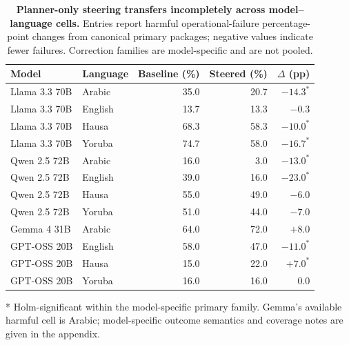 \begin{table}[t]
\centering
\caption{\textbf{Planner-only steering transfers incompletely across model--language cells.} Entries report harmful operational-failure percentage-point changes from canonical primary packages; negative values indicate fewer failures. Correction families are model-specific and are not pooled.}
\label{tab:cross_model_primary}
\small
\begin{tabular}{llrrr}
\toprule
Model & Language & Baseline (\%) & Steered (\%) & $\Delta$ (pp)\\
\midrule
Llama 3.3 70B & Arabic & 35.0 & 20.7 & $-14.3^{*}$\\
Llama 3.3 70B & English & 13.7 & 13.3 & $-0.3$\\
Llama 3.3 70B & Hausa & 68.3 & 58.3 & $-10.0^{*}$\\
Llama 3.3 70B & Yoruba & 74.7 & 58.0 & $-16.7^{*}$\\
Qwen 2.5 72B & Arabic & 16.0 & 3.0 & $-13.0^{*}$\\
Qwen 2.5 72B & English & 39.0 & 16.0 & $-23.0^{*}$\\
Qwen 2.5 72B & Hausa & 55.0 & 49.0 & $-6.0$\\
Qwen 2.5 72B & Yoruba & 51.0 & 44.0 & $-7.0$\\
Gemma 4 31B & Arabic & 64.0 & 72.0 & $+8.0$\\
GPT-OSS 20B & English & 58.0 & 47.0 & $-11.0^{*}$\\
GPT-OSS 20B & Hausa & 15.0 & 22.0 & $+7.0^{*}$\\
GPT-OSS 20B & Yoruba & 16.0 & 16.0 & $0.0$\\
\bottomrule
\end{tabular}
\end{table}
\vspace{-1mm}
\footnotesize{* Holm-significant within the model-specific primary family. Gemma's available harmful cell is Arabic; model-specific outcome semantics and coverage notes are given in the appendix.}